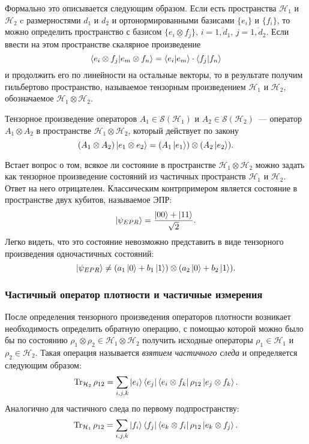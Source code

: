 Формально это описывается следующим образом. Если есть пространства $\mathcal{H}_1$ и $\mathcal{H}_2$ c размерностями $d_1$ и $d_2$ и ортонормированными базисами $\{e_i\}$ и $\{f_i\}$, то можно определить пространство с базисом $\{e_i \otimes f_j\},\, i = \overline{1,d_1},\, j = \overline{1,d_2}$. Если ввести на этом пространстве скалярное произведение
\begin{equation}
  \left\langle e_i \otimes f_j|e_m \otimes f_n\right\rangle = \left\langle e_i|e_m\right\rangle \cdot \left\langle f_j|f_n\right\rangle 
\end{equation}
 и продолжить его по линейности на остальные векторы, то в результате получим гильбертово пространство, называемое тензорным произведением $\mathcal{H}_1$ и $\mathcal{H}_2$, обозначаемое $\mathcal{H}_1 \otimes \mathcal{H}_2$.

Тензорное произведение операторов $A_1 \in \mathcal{S}(\mathcal{H}_1)$ и $A_2 \in \mathcal{S}(\mathcal{H}_2)$~--- оператор $A_1 \otimes A_2$ в пространстве $\mathcal{H}_1 \otimes \mathcal{H}_2$, который действует по закону
\begin{equation} 
  (A_1 \otimes A_2)\left| e_1 \otimes e_2 \right\rangle = (A_1\left| e_1 \right\rangle)\otimes(A_2\left| e_2 \right\rangle). 
\end{equation}

Встает вопрос о том, всякое ли состояние в пространстве $\mathcal{H}_1 \otimes \mathcal{H}_2$ можно задать как тензорное произведение состояний из частичных пространств $\mathcal{H}_1$ и $\mathcal{H}_2$. Ответ на него отрицателен.
Классическим контрпримером является состояние в пространстве двух кубитов, называемое ЭПР:
\begin{equation}\label{epr_state}  
  \left| \psi_{EPR} \right\rangle = \frac{\left| 00 \right\rangle + \left| 11 \right\rangle}{\sqrt{2}}.
\end{equation}
Легко видеть, что это состояние невозможно представить в виде тензорного произведения одночастичных состояний: 
\begin{equation}
  \left| \psi_{EPR} \right\rangle \neq (a_1\left| 0 \right\rangle + b_1\left| 1 \right\rangle) \otimes (a_2 \left| 0 \right\rangle + b_2 \left| 1 \right\rangle).
\end{equation}

\subsubsection{Частичный оператор плотности и частичные измерения}
После определения тензорного произведения операторов плотности возникает необходимость определить обратную операцию, с помощью которой можно было бы по состоянию $\rho_1 \otimes \rho_2 \in \mathcal{H}_1 \otimes \mathcal{H}_2$ получить исходные операторы $\rho_1 \in \mathcal{H}_1$ и $\rho_2 \in \mathcal{H}_2$. 
Такая операция называется \textit{взятием частичного следа} и определяется следующим образом:
\begin{equation} \operatorname{Tr}_{\mathcal{H}_2}\rho_{12} = \sum_{i,j,k} \left| e_i \right\rangle\left\langle e_j \right| \left\langle e_i \otimes f_k \right| \rho_{12} \left| e_j \otimes f_k \right\rangle. \end{equation}
Аналогично для частичного следа по первому подпространству:
\begin{equation} \operatorname{Tr}_{\mathcal{H}_1}\rho_{12} = \sum_{i,j,k} \left| f_i \right\rangle\left\langle f_j \right| \left\langle e_k \otimes f_i \right| \rho_{12} \left| e_k \otimes f_j \right\rangle. \end{equation}

